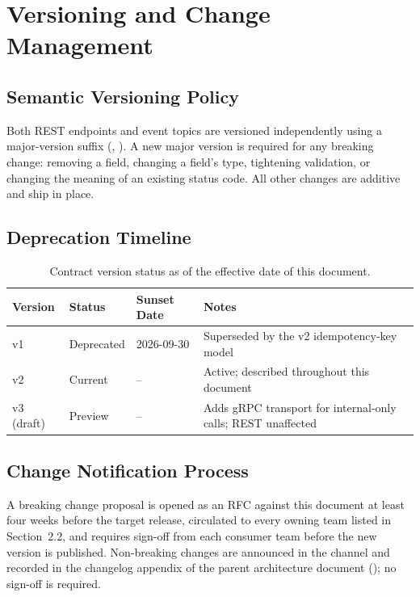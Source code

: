 \section{Versioning and Change Management}

\subsection{Semantic Versioning Policy}
Both REST endpoints and event topics are versioned independently using a major-version suffix
(, ). A new major version is required for any breaking
change: removing a field, changing a field's type, tightening validation, or changing the
meaning of an existing status code. All other changes are additive and ship in place.

\subsection{Deprecation Timeline}
\begin{table}[h!]
\centering
\small
\begin{tabularx}{\linewidth}{@{}l l l X@{}}
\toprule
\textbf{Version} & \textbf{Status} & \textbf{Sunset Date} & \textbf{Notes} \\
\midrule
v1 & Deprecated & 2026-09-30 & Superseded by the v2 idempotency-key model \\
v2 & Current    & --         & Active; described throughout this document \\
v3 (draft) & Preview & -- & Adds gRPC transport for internal-only calls; REST unaffected \\
\bottomrule
\end{tabularx}
\caption{Contract version status as of the effective date of this document.}
\end{table}

\subsection{Change Notification Process}
A breaking change proposal is opened as an RFC against this document at least four weeks
before the target release, circulated to every owning team listed in Section~2.2, and
requires sign-off from each consumer team before the new version is published. Non-breaking
changes are announced in the  channel and recorded in the
changelog appendix of the parent architecture document (); no sign-off is
required.

